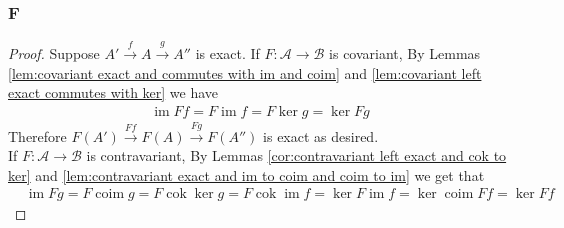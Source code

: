 \documentclass{article}
\newcommand{\fA}{\mathscr{A}}
\newcommand{\fB}{\mathscr{B}}
\DeclareMathOperator{\im}{im}
\DeclareMathOperator{\coim}{coim}
\DeclareMathOperator{\cok}{cok}
\begin{document}
\subsubsection{F}\label{1.6.F}
\begin{proof}
    Suppose $A' \xrightarrow{f} A\xrightarrow{g}A''$ is exact. If $F:\fA\to \fB$ is covariant, By Lemmas \ref{lem:covariant exact and commutes with im and coim} and \ref{lem:covariant left exact commutes with ker} we have
    \begin{align*}
        \im Ff=F\im f=F\ker g=\ker Fg
    \end{align*}
    Therefore $F(A')\xrightarrow{Ff} F(A) \xrightarrow{Fg}F(A'')$ is exact as desired. \\
    If $F:\fA\to \fB$ is contravariant, By Lemmas \ref{cor:contravariant left exact and cok to ker} and \ref{lem:contravariant exact and im to coim and coim to im} we get that 
    \begin{align*}
        &\im Fg=F\coim g=F\cok \ker g=F\cok \im f=\ker F\im f=\ker \coim Ff=\ker Ff
    \end{align*}
   
\end{proof}
\end{document}
